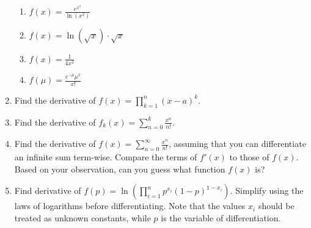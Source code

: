 \documentclass{article}
\begin{document}
\begin{enumerate}
\begin{enumerate}
                    \item $ f(x) = \frac{e^{x^2}}{\ln(x^2)}$
                    \item $ f(x) = \ln(\sqrt{x})\cdot \sqrt{x}$
                    \item $ f(x) = \frac{1}{4x^2}$
                    \item $ f(\mu) = \frac{e^{-\mu}\mu^x}{x!}$
                \end{enumerate}
                \item Find the derivative of $ f(x)=\prod_{k=1}^n (x-a)^k$. 
                \item Find the derivative of $ f_k(x) = \sum_{n=0}^k \frac{x^n}{n!}$.
                \item Find the derivative of $ f(x) = \sum_{n=0}^\infty \frac{x^n}{n!}$, assuming that you can differentiate an infinite sum term-wise. Compare the terms of $f'(x)$ to those of $f(x)$. Based on your observation, can you guess what function $f(x)$ is?
                \item Find derivative of $ f(p) = \ln{\left(\prod_{i=1}^n p^{x_i}(1-p)^{1-x_i}\right)}$. Simplify using the laws of logarithms before differentiating. Note that the values $x_i$ should be treated as unknown constants, while $p$ is the variable of differentiation.
          
                
           
                \end{enumerate}
\end{document}
